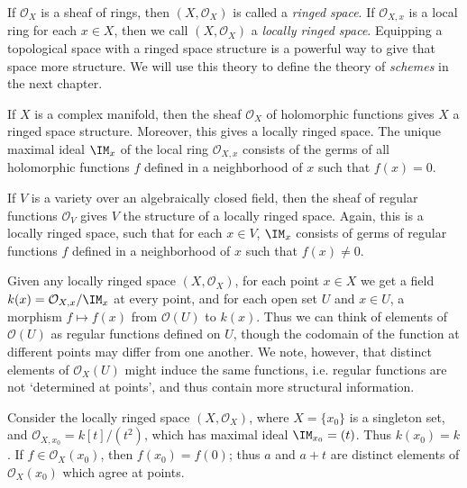 If $\mathcal{O}_X$ is a sheaf of rings, then $(X,\mathcal{O}_X)$ is called a \emph{ringed space}. If $\mathcal{O}_{X,x}$ is a local ring for each $x \in X$, then we call $(X,\mathcal{O}_X)$ a \emph{locally ringed space}. Equipping a topological space with a ringed space structure is a powerful way to give that space more structure. We will use this theory to define the theory of \emph{schemes} in the next chapter.

\begin{example}
    If $X$ is a complex manifold, then the sheaf $\mathcal{O}_X$ of holomorphic functions gives $X$ a ringed space structure. Moreover, this gives a locally ringed space. The unique maximal ideal $\IM_x$ of the local ring $\mathcal{O}_{X,x}$ consists of the germs of all holomorphic functions $f$ defined in a neighborhood of $x$ such that $f(x) = 0$.
\end{example}

\begin{example}
    If $V$ is a variety over an algebraically closed field, then the sheaf of regular functions $\mathcal{O}_V$ gives $V$ the structure of a locally ringed space. Again, this is a locally ringed space, such that for each $x \in V$, $\IM_x$ consists of germs of regular functions $f$ defined in a neighborhood of $x$ such that $f(x) \neq 0$.
\end{example}

Given any locally ringed space $(X,\mathcal{O}_X)$, for each point $x \in X$ we get a field $k(x) = \mathcal{O}_{X,x}/\IM_x$ at every point, and for each open set $U$ and $x \in U$, a morphism $f \mapsto f(x)$ from $\mathcal{O}(U)$ to $k(x)$. Thus we can think of elements of $\mathcal{O}(U)$ as regular functions defined on $U$, though the codomain of the function at different points may differ from one another. We note, however, that distinct elements of $\mathcal{O}_X(U)$ might induce the same functions, i.e. regular functions are not `determined at points', and thus contain more structural information.

\begin{example}
    Consider the locally ringed space $(X,\mathcal{O}_X)$, where $X = \{ x_0 \}$ is a singleton set, and $\mathcal{O}_{X,x_0} = k[t]/(t^2)$, which has maximal ideal $\IM_{x_0} = (t)$. Thus $k(x_0) = k$. If $f \in \mathcal{O}_X(x_0)$, then $f(x_0) = f(0)$; thus $a$ and $a + t$ are distinct elements of $\mathcal{O}_X(x_0)$ which agree at points.
\end{example}

